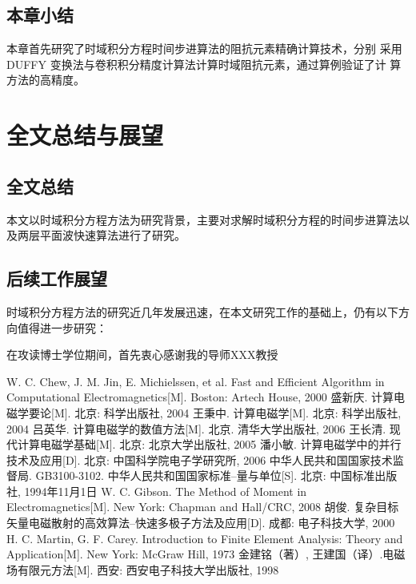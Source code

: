 \documentclass[doctor]{thesisUESTC}
\begin{document}
\section{本章小结}
本章首先研究了时域积分方程时间步进算法的阻抗元素精确计算技术，分别
采用DUFFY 变换法与卷积积分精度计算法计算时域阻抗元素，通过算例验证了计
算方法的高精度。

\chapter{全文总结与展望}

\section{全文总结}
本文以时域积分方程方法为研究背景，主要对求解时域积分方程的时间步进算法以及两层平面波快速算法进行了研究。

\section{后续工作展望}
时域积分方程方法的研究近几年发展迅速，在本文研究工作的基础上，仍有以下方向值得进一步研究：

\thesisacknowledgement
在攻读博士学位期间，首先衷心感谢我的导师XXX教授

\begin{thesisbibliography}

 W. C. Chew, J. M. Jin, E. Michielssen, et al. Fast and Efficient Algorithm in Computational Electromagnetics[M]. Boston: Artech House, 2000
 盛新庆. 计算电磁学要论[M]. 北京: 科学出版社, 2004
 王秉中. 计算电磁学[M]. 北京: 科学出版社, 2004
 吕英华. 计算电磁学的数值方法[M]. 北京. 清华大学出版社, 2006
 王长清. 现代计算电磁学基础[M]. 北京: 北京大学出版社, 2005
 潘小敏. 计算电磁学中的并行技术及应用[D]. 北京: 中国科学院电子学研究所, 2006
 中华人民共和国国家技术监督局. GB3100-3102. 中华人民共和国国家标准--量与单位[S]. 北京: 中国标准出版社, 1994年11月1日
 W. C. Gibson. The Method of Moment in Electromagnetics[M]. New York: Chapman and Hall/CRC, 2008
 胡俊. 复杂目标矢量电磁散射的高效算法--快速多极子方法及应用[D]. 成都: 电子科技大学, 2000
 H. C. Martin, G. F. Carey. Introduction to Finite Element Analysis: Theory and Application[M]. New York: McGraw Hill, 1973
 金建铭（著）, 王建国（译）.电磁场有限元方法[M]. 西安: 西安电子科技大学出版社, 1998

\end{thesisbibliography}
\end{document}
